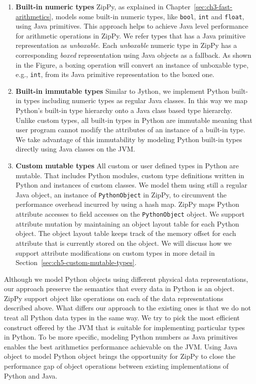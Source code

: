 \begin{enumerate}

\item \textbf{Built-in numeric types}
ZipPy, as explained in Chapter~\ref{sec:ch3-fast-arithmetics}, models some built-in numeric types, like \texttt{bool}, \texttt{int} and \texttt{float}, using Java primitives.
This approach helps to achieve Java level performance for arithmetic operations in ZipPy.
We refer types that has a Java primitive representation as \emph{unboxable}.
Each \emph{unboxable} numeric type in ZipPy has a corresponding \emph{boxed} representation using Java objects as a fallback.
As shown in the Figure, a boxing operation will convert an instance of unboxable type, e.g., \texttt{int}, from its Java primitive representation to the boxed one.

\item \textbf{Built-in immutable types}
Similar to Jython, we implement Python built-in types including numeric types as regular Java classes.
In this way we map Python's built-in type hierarchy onto a Java class based type hierarchy.
Unlike custom types, all built-in types in Python are immutable meaning that user program cannot modify the attributes of an instance of a built-in type.
We take advantage of this immutability by modeling Python built-in types directly using Java classes on the JVM.

\item \textbf{Custom mutable types}
All custom or user defined types in Python are mutable.
That includes Python modules, custom type definitions written in Python and instances of custom classes.
We model them using still a regular Java object, an instance of \texttt{PythonObject} in ZipPy, to circumvent the performance overhead incurred by using a hash map.
ZipPy maps Python attribute accesses to field accesses on the \texttt{PythonObject} object.
We support attribute mutation by maintaining an object layout table for each Python object.
The object layout table keeps track of the memory offset for each attribute that is currently stored on the object.
We will discuss how we support attribute modifications on custom types in more detail in Section~\ref{sec:ch5-custom-mutable-types}.

\end{enumerate}

Although we model Python objects using different physical data representations, our approach preserve the semantics that every data in Python is an object.
ZipPy support object like operations on each of the data representations described above.
What differs our approach to the existing ones is that we do not treat all Python data types in the same way.
We try to pick the most efficient construct offered by the JVM that is suitable for implementing particular types in Python.
To be more specific, modeling Python numbers as Java primitives enables the best arithmetics performance achievable on the JVM.
Using Java object to model Python object brings the opportunity for ZipPy to close the performance gap of object operations between existing implementations of Python and Java.

